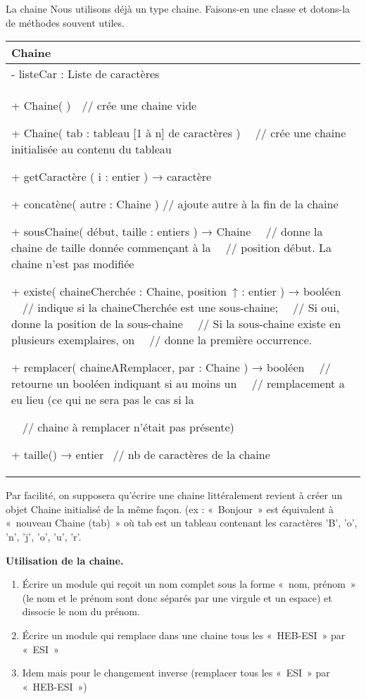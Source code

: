 \begin{Exercice}{La chaine}
	Nous utilisons déjà un type chaine.
	Faisons-en une classe et dotons-la de
	méthodes souvent utiles.

	\begin{center}
	\tablehead{}
	\begin{supertabular}{|m{11.597cm}|}
		\hline
		\centering\arraybslash  Chaine\\\hline
		 {}- listeCar : Liste de caractères\\\hline
		{ + Chaine( )\ \ // crée une chaine vide}

		{ {+ }Chaine( tab : tableau [1 à n] de caractères )
		\ \ // crée une chaine initialisée au contenu du tableau}

		{ {+ getCaractère ( i : entier ) }\textsf{→} {caractère}}

		{ + concatène( autre : Chaine ) // ajoute autre à
		la fin de la chaine}

		{ {+ sousChaine( début,
		taille : entiers ) }\textsf{→} {Chaine
		\ \ // donne la chaine de taille donnée commençant à la
		\ \ // position début. La chaine n'est pas modifiée}}

		{ {+ existe(
		chaineCherchée : Chaine, position~}\textsf{↑}
		:{ entier ) }\textsf{→}
		{booléen
		\ \ // indique si la chaineCherchée est une sous-chaine;
		\ \ // Si oui, donne la position de la sous-chaine
		\ \ // Si la sous-chaine existe en plusieurs exemplaires, on
		\ \ // donne la première occurrence.}}

		{ {+ remplacer(
		chaineARemplacer, par : Chaine ) }\textsf{→}
		{booléen
		\ \ // retourne un booléen indiquant si au moins un
		\ \ // remplacement a eu lieu (ce qui ne sera pas le cas si la}}

		{ \ \ // chaine à remplacer n’était pas
		présente)}

		 {+ taille() }\textsf{→}
		{entier \ // nb de caractères de la
		chaine}\\\hline
	\end{supertabular}
	\end{center}
	
	Par facilité, on supposera qu’écrire une chaine littéralement revient à
	créer un objet Chaine initialisé de la même façon. (ex : «~Bonjour~»
	est équivalent à «~nouveau Chaine (tab)~» où tab est un tableau
	contenant les caractères 'B',
	'o',
	'n',
	'j',
	'o',
	'u',
	'r'.

	\textbf{Utilisation de la chaine.}

	\liststyleListv
	\begin{enumerate}[label=\alph*)]
		\item 
			Écrire un module qui reçoit un nom complet
			sous la forme «~nom, prénom~» (le nom et le prénom sont donc séparés
			par une virgule et un espace) et dissocie le nom du prénom. 
		\item 
			Écrire un module qui remplace dans une chaine
			tous les «~HEB-ESI~» par «~ESI~»
		\item 
			Idem mais pour le changement inverse 
			(remplacer tous les «~ESI~» par «~HEB-ESI~»)
	\end{enumerate}
\end{Exercice}

